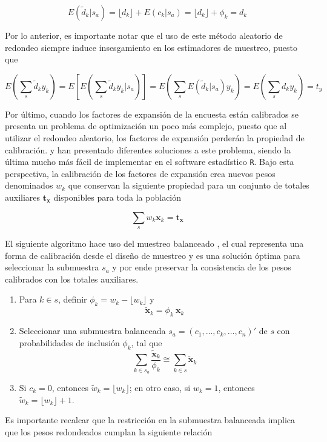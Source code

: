 \documentclass[
  12pt,
  spanish,
]{book}
\begin{document}
\[
E(\tilde d_k | s_a) 
= \lfloor d_k \rfloor + E(c_k|s_a) 
= \lfloor d_k \rfloor + \phi_k
= d_k
\]

Por lo anterior, es importante notar que el uso de este método aleatorio de redondeo siempre induce insesgamiento en los estimadores de muestreo, puesto que

\[
E \left( \sum_s \tilde d_k y_k \right) 
= E \left[ E \left( \sum_s \tilde d_k y_k  | s_a\right)  \right] 
= E \left( \sum_s E(\tilde d_k | s_a) y_k \right) 
= E \left( \sum_s d_k y_k \right) = t_y
\]

Por último, cuando los factores de expansión de la encuesta están calibrados se presenta un problema de optimización un poco más complejo, puesto que al utilizar el redondeo aleatorio, los factores de expansión perderán la propiedad de calibración. \citet{Sartore_Toppin_Young_Spiegelman_2019} y \citet{Tille} han presentado diferentes soluciones a este problema, siendo la última mucho más fácil de implementar en el software estadístico \texttt{R}. Bajo esta perspectiva, la calibración de los factores de expansión crea nuevos pesos denominados \(w_k\) que conservan la siguiente propiedad para un conjunto de totales auxiliares \(\mathbf{t_x}\) disponibles para toda la población

\[
\sum_s w_k \mathbf{x}_k =  \mathbf{t_x}
\]

El siguiente algoritmo hace uso del muestreo balanceado \citep[capítulo 8]{Tille_2006}, el cual representa una forma de calibración desde el diseño de muestreo y es una solución óptima para seleccionar la submuestra \(s_a\) y por ende preservar la consistencia de los pesos calibrados con los totales auxiliares.

\begin{enumerate}
\def\labelenumi{\arabic{enumi}.}
\item
  Para \(k \in s\), definir \(\phi_k = w_k - \lfloor w_k \rfloor\) y
  \[
  \tilde{\mathbf{x}}_k = \phi_k \ \mathbf{x}_k
  \]
\item
  Seleccionar una submuestra balanceada \(s_a=(c_1,\ldots,c_k,\ldots,c_n)'\) de \(s\) con probabilidades de inclusión \(\phi_k\), tal que
  \[
  \sum_{k \in s_a} \frac{\tilde{\mathbf{x}}_k}{\phi_k} 
  \cong
  \sum_{k \in s} \tilde{\mathbf{x}}_k
  \]
\item
  Si \(c_k = 0\), entonces \(\tilde w_k = \lfloor w_k \rfloor\); en otro caso, si \(w_k = 1\), entonces \(\tilde w_k = \lfloor w_k \rfloor + 1\).
\end{enumerate}

Es importante recalcar que la restricción en la submuestra balanceada implica que los pesos redondeados cumplan la siguiente relación
\end{document}
